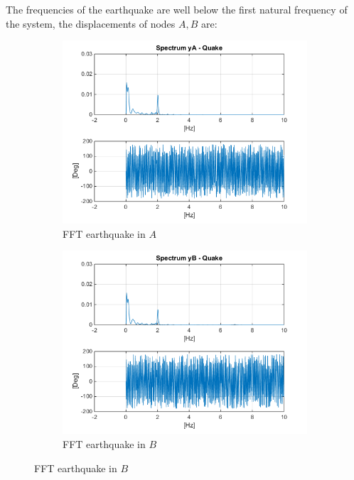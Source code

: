 \documentclass[10pt,a4paper,final]{report}
\begin{document}
\newpage
The frequencies of the earthquake are well below the first natural frequency of the system, the displacements of nodes $A,B$ are:
\begin{figure}[h]
        \centering
        \begin{subfigure}[t]{0.5\textwidth}
                \includegraphics[width=\textwidth]{earthquake4}
                \caption{FFT earthquake in $A$}
                \label{fig:earthquake4}
        \end{subfigure}%
        \begin{subfigure}[t]{0.5\textwidth}
                \includegraphics[width=\textwidth]{earthquake5}
                \caption{FFT earthquake in $B$}
                \label{fig:earthquake5}
        \end{subfigure}
         \label{fig:earthquake45}
\end{figure}
\end{document}
